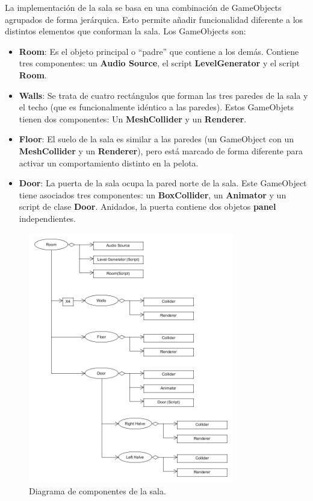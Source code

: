 La implementación de la sala se basa en una combinación de GameObjects agrupados de forma jerárquica. Esto permite añadir funcionalidad diferente a los distintos elementos que conforman la sala. Los GameObjects son:
\begin{itemize}
\item \textbf{Room}: Es el objeto principal o ``padre'' que contiene a los demás. Contiene tres componentes: un \textbf{Audio Source}, el script \textbf{LevelGenerator} y el script \textbf{Room}.
\item \textbf{Walls}: Se trata de cuatro rectángulos que forman las tres paredes de la sala y el techo (que es funcionalmente idéntico a las paredes). Estos GameObjets tienen dos componentes: Un \textbf{MeshCollider} y un \textbf{Renderer}.
\item \textbf{Floor}: El suelo de la sala es similar a las paredes (un GameObject con un \textbf{MeshCollider} y un \textbf{Renderer}), pero está marcado de forma diferente para activar un comportamiento distinto en la pelota.
\item \textbf{Door}: La puerta de la sala ocupa la pared norte de la sala. Este GameObject tiene asociados tres componentes: un \textbf{BoxCollider}, un \textbf{Animator} y un script de clase \textbf{Door}. Anidados, la puerta contiene dos objetos \textbf{panel} independientes.
\end{itemize}

\begin{figure}[h]
	\includegraphics[width=0.8\textwidth]{images/estructura/objetos/room}
	\centering
	\caption{Diagrama de componentes de la sala.}
\end{figure}


